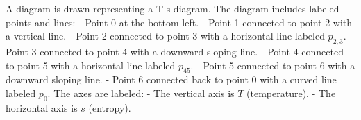 A diagram is drawn representing a T-s diagram. The diagram includes labeled points and lines:  
- Point 0 at the bottom left.  
- Point 1 connected to point 2 with a vertical line.  
- Point 2 connected to point 3 with a horizontal line labeled \( p_{2,3} \).  
- Point 3 connected to point 4 with a downward sloping line.  
- Point 4 connected to point 5 with a horizontal line labeled \( p_{45} \).  
- Point 5 connected to point 6 with a downward sloping line.  
- Point 6 connected back to point 0 with a curved line labeled \( p_0 \).  
The axes are labeled:  
- The vertical axis is \( T \) (temperature).  
- The horizontal axis is \( s \) (entropy).